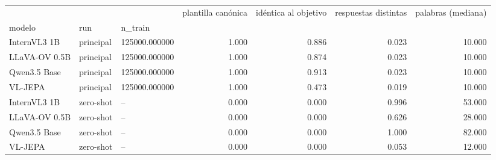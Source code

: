 \begin{tabular}{lllrrrr}
\toprule
 &  &  & plantilla canónica & idéntica al objetivo & respuestas distintas & palabras (mediana) \\
modelo & run & n\_train &  &  &  &  \\
\midrule
InternVL3 1B & principal & 125000.000000 & 1.000 & 0.886 & 0.023 & 10.000 \\
\cline{1-7} \cline{2-7}
LLaVA-OV 0.5B & principal & 125000.000000 & 1.000 & 0.874 & 0.023 & 10.000 \\
\cline{1-7} \cline{2-7}
Qwen3.5 Base & principal & 125000.000000 & 1.000 & 0.913 & 0.023 & 10.000 \\
\cline{1-7} \cline{2-7}
VL-JEPA & principal & 125000.000000 & 1.000 & 0.473 & 0.019 & 10.000 \\
\cline{1-7} \cline{2-7}
InternVL3 1B & zero-shot & -- & 0.000 & 0.000 & 0.996 & 53.000 \\
\cline{1-7} \cline{2-7}
LLaVA-OV 0.5B & zero-shot & -- & 0.000 & 0.000 & 0.626 & 28.000 \\
\cline{1-7} \cline{2-7}
Qwen3.5 Base & zero-shot & -- & 0.000 & 0.000 & 1.000 & 82.000 \\
\cline{1-7} \cline{2-7}
VL-JEPA & zero-shot & -- & 0.000 & 0.000 & 0.053 & 12.000 \\
\cline{1-7} \cline{2-7}
\bottomrule
\end{tabular}
